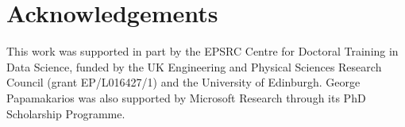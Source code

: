 \section*{Acknowledgements}
This work was supported in part by the EPSRC Centre for Doctoral Training in Data Science, funded by the UK Engineering and Physical Sciences Research Council (grant EP/L016427/1) and the University of Edinburgh. George Papamakarios was also supported by Microsoft Research through its PhD Scholarship Programme.
